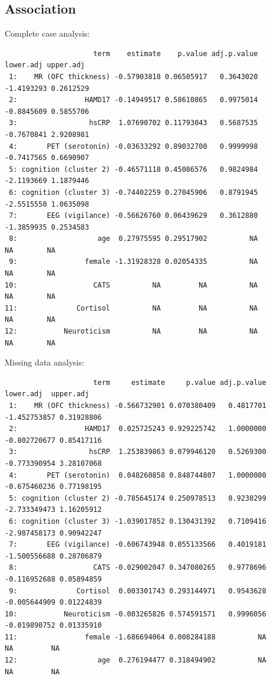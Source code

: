 \documentclass[12pt]{article}
\begin{document}
\subsection{Association}
\label{sec:orgcd78da9}
Complete case analysis:
\begin{verbatim}
                     term    estimate    p.value adj.p.value  lower.adj upper.adj
 1:    MR (OFC thickness) -0.57903818 0.06505917   0.3643020 -1.4193293 0.2612529
 2:                HAMD17 -0.14949517 0.58610865   0.9975014 -0.8845609 0.5855706
 3:                 hsCRP  1.07690702 0.11793043   0.5687535 -0.7670841 2.9208981
 4:       PET (serotonin) -0.03633292 0.89032700   0.9999998 -0.7417565 0.6690907
 5: cognition (cluster 2) -0.46571118 0.45086576   0.9824984 -2.1193669 1.1879446
 6: cognition (cluster 3) -0.74402259 0.27045906   0.8791945 -2.5515550 1.0635098
 7:       EEG (vigilance) -0.56626760 0.06439629   0.3612880 -1.3859935 0.2534583
 8:                   age  0.27975595 0.29517902          NA         NA        NA
 9:                female -1.31928328 0.02054335          NA         NA        NA
10:                  CATS          NA         NA          NA         NA        NA
11:              Cortisol          NA         NA          NA         NA        NA
12:           Neuroticism          NA         NA          NA         NA        NA
\end{verbatim}

Missing data analysis:
\begin{verbatim}
                     term     estimate     p.value adj.p.value    lower.adj  upper.adj
 1:    MR (OFC thickness) -0.566732901 0.070380409   0.4817701 -1.452753857 0.31928806
 2:                HAMD17  0.025725243 0.929225742   1.0000000 -0.802720677 0.85417116
 3:                 hsCRP  1.253839863 0.079946120   0.5269300 -0.773390954 3.28107068
 4:       PET (serotonin)  0.048260858 0.848744807   1.0000000 -0.675460236 0.77198195
 5: cognition (cluster 2) -0.785645174 0.250978513   0.9230299 -2.733349473 1.16205912
 6: cognition (cluster 3) -1.039017852 0.130431392   0.7109416 -2.987458173 0.90942247
 7:       EEG (vigilance) -0.606743948 0.055133566   0.4019181 -1.500556688 0.28706879
 8:                  CATS -0.029002047 0.347080265   0.9778696 -0.116952688 0.05894859
 9:              Cortisol  0.003301743 0.293144971   0.9543628 -0.005644909 0.01224839
10:           Neuroticism -0.003265826 0.574591571   0.9996056 -0.019890752 0.01335910
11:                female -1.686694064 0.008284188          NA           NA         NA
12:                   age  0.276194477 0.318494902          NA           NA         NA
\end{verbatim}
\end{document}
